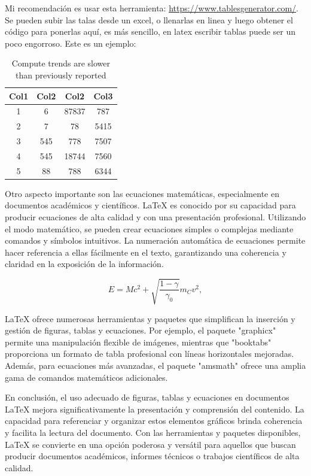 Mi recomendación es usar esta herramienta: \url{https://www.tablesgenerator.com/}. Se pueden subir las talas desde un excel, o llenarlas en linea y luego obtener el código para ponerlas aquí, es más sencillo, en latex escribir tablas puede ser un poco engorroso. Este es un ejemplo:

\begin{table}[htb]
\caption{Compute trends are slower than previously reported}
\label{tab:enter-label}
\centering
 \begin{tabular}{cccc} 
 \hline
 Col1 & Col2 & Col2 & Col3 \\ [0.5ex] 
 \hline
 1 & 6 & 87837 & 787 \\ 
 2 & 7 & 78 & 5415 \\
 3 & 545 & 778 & 7507 \\
 4 & 545 & 18744 & 7560 \\
 5 & 88 & 788 & 6344 \\
 \hline
 \end{tabular}
\end{table}

Otro aspecto importante son las ecuaciones matemáticas, especialmente en documentos académicos y científicos. LaTeX es conocido por su capacidad para producir ecuaciones de alta calidad y con una presentación profesional. Utilizando el modo matemático, se pueden crear ecuaciones simples o complejas mediante comandos y símbolos intuitivos. La numeración automática de ecuaciones permite hacer referencia a ellas fácilmente en el texto, garantizando una coherencia y claridad en la exposición de la información.

\begin{equation}
    E=Mc^2+\sqrt{\frac{1-\gamma}{\gamma_0}}m_Cv^2,
\end{equation}

LaTeX ofrece numerosas herramientas y paquetes que simplifican la inserción y gestión de figuras, tablas y ecuaciones. Por ejemplo, el paquete "graphicx" permite una manipulación flexible de imágenes, mientras que "booktabs" proporciona un formato de tabla profesional con líneas horizontales mejoradas. Además, para ecuaciones más avanzadas, el paquete "amsmath" ofrece una amplia gama de comandos matemáticos adicionales.

En conclusión, el uso adecuado de figuras, tablas y ecuaciones en documentos LaTeX mejora significativamente la presentación y comprensión del contenido. La capacidad para referenciar y organizar estos elementos gráficos brinda coherencia y facilita la lectura del documento. Con las herramientas y paquetes disponibles, LaTeX se convierte en una opción poderosa y versátil para aquellos que buscan producir documentos académicos, informes técnicos o trabajos científicos de alta calidad.